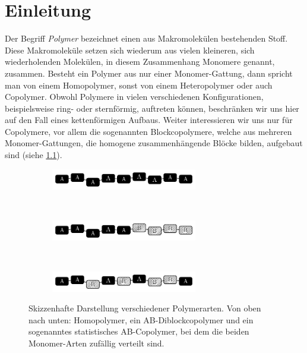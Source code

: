 \documentclass[../main.tex]{subfiles}
\begin{document}
\chapter{Einleitung} %
\label{chapter:einleitung}

Der Begriff \emph{Polymer} bezeichnet einen aus Makromolekülen bestehenden Stoff.
Diese Makromoleküle setzen sich wiederum aus vielen kleineren, sich wiederholenden Molekülen, in diesem Zusammenhang Monomere genannt, zusammen.
Besteht ein Polymer aus nur einer Monomer-Gattung, dann spricht man von einem Homopolymer, sonst von einem Heteropolymer oder auch Copolymer.
Obwohl Polymere in vielen verschiedenen Konfigurationen, beispielsweise ring- oder sternförmig, auftreten können, beschränken wir uns hier auf den Fall eines kettenförmigen Aufbaus.
Weiter interessieren wir uns nur für Copolymere, vor allem die sogenannten Blockcopolymere, welche aus mehreren Monomer-Gattungen, die homogene zusammenhängende Blöcke bilden, aufgebaut sind (siehe \cref{figure:polymerketten}).

\begin{figure}[tb]
    \centering
    \begin{subfigure}[b]{\textwidth}
        \centering
        \includegraphics[width=0.7\textwidth]{figures/einleitung/copoly1.pdf}
    \end{subfigure}
    \\[-0.75em]
    \begin{subfigure}[b]{\textwidth}
        \centering
        \includegraphics[width=0.7\textwidth]{figures/einleitung/copoly2.pdf}
    \end{subfigure}
    \\[-0.75em]
    \begin{subfigure}[b]{\textwidth}
        \centering
        \includegraphics[width=0.7\textwidth]{figures/einleitung/copoly3.pdf}
    \end{subfigure}
    \caption[Skizzenhafte Darstellung verschiedener Polymerarten]{%
        Skizzenhafte Darstellung verschiedener Polymerarten.
        Von oben nach unten: Homopolymer, ein AB-Diblockcopolymer und ein sogenanntes statistisches AB-Copolymer, bei dem die beiden Monomer-Arten zufällig verteilt sind.
    }
    \label{figure:polymerketten}
\end{figure}
\end{document}
